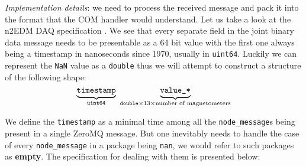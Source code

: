\textit{Implementation details}: we need to process the received message and pack it into the format that the COM handler would understand. Let us take a look at the n2EDM DAQ specification \cite{Bison2018}. We see that every separate field in the joint binary data message needs to be presentable as a 64 bit value with the first one always being a timestamp in nanoseconds since 1970, usually in \texttt{uint64}. Luckily we can \cite{WorkingGroupforFloating-PointArithmetic1985} represent the \texttt{NaN} value as a \texttt{double} thus we will attempt to construct a structure of the following shape:
\[
\underbrace{\texttt{timestamp}}_{\texttt{uint64}}
\ 
\underbrace{\vphantom{\texttt{timestamp}} \texttt{value\_*}}_{\texttt{double} \times 13 \times \text{number of magnetometers}}
\]

We define the \texttt{timestamp} as a minimal time among all the \texttt{node\_message}s being present in a single ZeroMQ message. But one inevitably needs to handle the case of every \texttt{node\_message} in a package being \texttt{nan}, we would refer to such packages as \textbf{empty}. The specification for dealing with them is presented below:

